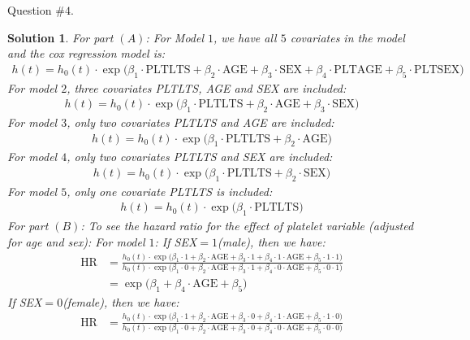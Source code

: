 \documentclass[11pt]{article}
\newtheorem{sol}{Solution}
\begin{document}
Question $\#4$.
\begin{sol}
	For part $(A)$:\vskip 2mm
	For Model $1$, we have all $5$ covariates in the model and the cox regression model is:
	\begin{align*}
		h(t) = h_0(t)\cdot \exp\Big(\beta_1\cdot\text{PLTLTS} + \beta_2\cdot \text{AGE} + 
			\beta_3\cdot \text{SEX} + \beta_4\cdot \text{PLTAGE} + \beta_5\cdot \text{PLTSEX}\Big)
	\end{align*}
	For model $2$, three covariates PLTLTS, AGE and SEX are included:
	\begin{align*}
		h(t) = h_0(t)\cdot \exp\Big(\beta_1\cdot \text{PLTLTS} + \beta_2\cdot \text{AGE} + \beta_3\cdot \text{SEX}\Big)
	\end{align*}
	For model $3$, only two covariates PLTLTS and AGE are included:
	\begin{align*}
		h(t) = h_0(t)\cdot \exp\Big(\beta_1\cdot\text{PLTLTS} + \beta_2\cdot\text{AGE}\Big)
	\end{align*}
	For model $4$, only two covariates PLTLTS and SEX are included:
	\begin{align*}
		h(t) = h_0(t)\cdot \exp\Big(\beta_1\cdot\text{PLTLTS} + \beta_2\cdot\text{SEX}\Big)
	\end{align*}
	For model $5$, only one covariate PLTLTS is included:
	\begin{align*}
		h(t) = h_0(t)\cdot\exp\Big(\beta_1\cdot \text{PLTLTS}\Big)
	\end{align*}
	For part $(B)$:\vskip 2mm
	To see the hazard ratio for the effect of platelet variable (adjusted for age and sex):\vskip 2mm
	For model $1$:\vskip 2mm
	If SEX$= 1$(male), then we have:
	\begin{align*}
		\text{HR} &= \frac{h_0(t)\cdot \exp\Big(\beta_1\cdot 1 + \beta_2\cdot \text{AGE} + \beta_3\cdot 1 + \beta_4\cdot 1\cdot \text{AGE} + \beta_5\cdot 1 \cdot 1\Big)}{h_0(t)\cdot \exp\Big(\beta_1\cdot 0 + \beta_2\cdot \text{AGE} + \beta_3\cdot 1 + \beta_4\cdot 0\cdot \text{AGE} + \beta_5\cdot 0 \cdot 1\Big)}\\
		&= \exp\Big(\beta_1 + \beta_4\cdot \text{AGE} + \beta_5\Big)
	\end{align*}
	If SEX$= 0$(female), then we have:
	\begin{align*}
		\text{HR} &= \frac{h_0(t)\cdot \exp\Big(\beta_1\cdot 1 + \beta_2\cdot\text{AGE} + \beta_3\cdot 0 + \beta_4\cdot 1\cdot \text{AGE} + \beta_5\cdot 1 \cdot 0\Big)}{h_0(t)\cdot\exp\Big(\beta_1\cdot 0 + \beta_2\cdot \text{AGE} + \beta_3\cdot 0 + \beta_4\cdot 0\cdot \text{AGE} + \beta_5\cdot 0 \cdot 0\Big)}\\

\end{align*}
\end{sol}
\end{document}
